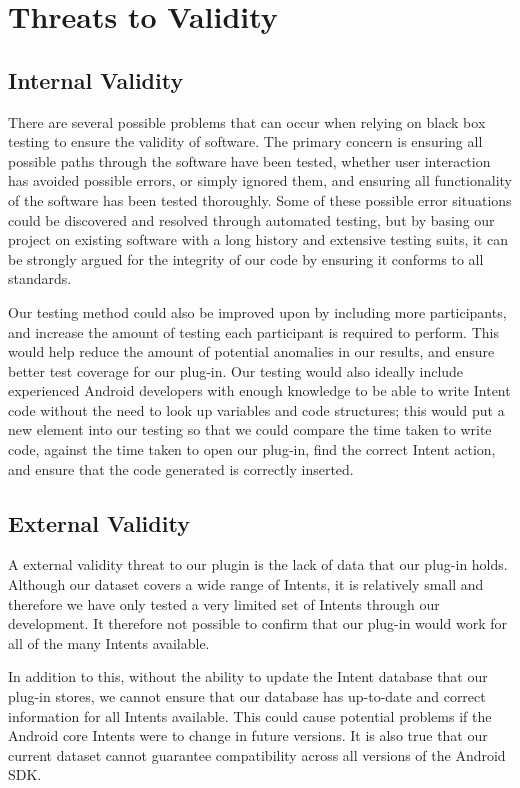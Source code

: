 \section{Threats to Validity}
\label{threatstovalidity}

\subsection{Internal Validity}
There are several possible problems that can occur when relying on black box testing to ensure the validity of software. The primary concern is ensuring all possible paths through the software have been tested, whether user interaction has avoided possible errors, or simply ignored them, and ensuring all functionality of the software has been tested thoroughly. Some of these possible error situations could be discovered and resolved through automated testing, but by basing our project on existing software with a long history and extensive testing suits, it can be strongly argued for the integrity of our code by ensuring it conforms to all standards.

Our testing method could also be improved upon by including more participants, and increase the amount of testing each participant is required to perform. This would help reduce the amount of potential anomalies in our results, and ensure better test coverage for our plug-in. Our testing would also ideally include experienced Android developers with enough knowledge to be able to write Intent code without the need to look up variables and code structures; this would put a new element into our testing so that we could compare the time taken to write code, against the time taken to open our plug-in, find the correct Intent action, and ensure that the code generated is correctly inserted.


\subsection{External Validity}

A external validity threat to our plugin is the lack of data that our plug-in holds. Although our dataset covers a wide range of Intents, it is relatively small and therefore we have only tested a very limited set of Intents through our development. It therefore not possible to confirm that our plug-in would work for all of the many Intents available.

In addition to this, without the ability to update the Intent database that our plug-in stores, we cannot ensure that our database has up-to-date and correct information for all Intents available. This could cause potential problems if the Android core Intents were to change in future versions. It is also true that our current dataset cannot guarantee compatibility across all versions of the Android SDK.
